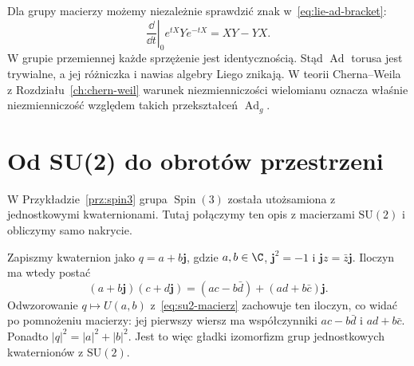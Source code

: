\begin{przyklad}
\label{prz:ad-matrix-torus}
Dla grupy macierzy możemy niezależnie sprawdzić znak
w~\eqref{eq:lie-ad-bracket}:
\[
 \left.\frac{\dd}{\dd t}\right|_0
 e^{tX}Ye^{-tX}=XY-YX.
\]
W grupie przemiennej każde sprzężenie jest identycznością.
Stąd $\operatorname{Ad}$ torusa jest trywialne, a jej
różniczka i nawias algebry Liego znikają.
W teorii Cherna--Weila z Rozdziału~\ref{ch:chern-weil}
warunek niezmienniczości wielomianu oznacza właśnie
niezmienniczość względem takich przekształceń
$\operatorname{Ad}_g$.
\end{przyklad}

\section{Od SU(2) do obrotów przestrzeni}
\label{sec:su2-so3-lie}

W Przykładzie~\ref{prz:spin3} grupa
$\operatorname{Spin}(3)$ została utożsamiona z jednostkowymi
kwaternionami. Tutaj połączymy ten opis z macierzami
$\mathrm{SU}(2)$ i obliczymy samo nakrycie.

Zapiszmy kwaternion jako $q=a+b\mathbf j$, gdzie $a,b\in\C$,
$\mathbf j^2=-1$ i $\mathbf jz=\bar z\mathbf j$.
Iloczyn ma wtedy postać
\[
 (a+b\mathbf j)(c+d\mathbf j)
 =(ac-b\bar d)+(ad+b\bar c)\mathbf j.
\]
Odwzorowanie $q\mapsto U(a,b)$ z~\eqref{eq:su2-macierz}
zachowuje ten iloczyn, co widać po pomnożeniu macierzy:
jej pierwszy wiersz ma współczynniki $ac-b\bar d$
i $ad+b\bar c$. Ponadto
$|q|^2=|a|^2+|b|^2$. Jest to więc gładki izomorfizm
grup jednostkowych kwaternionów z $\mathrm{SU}(2)$.

